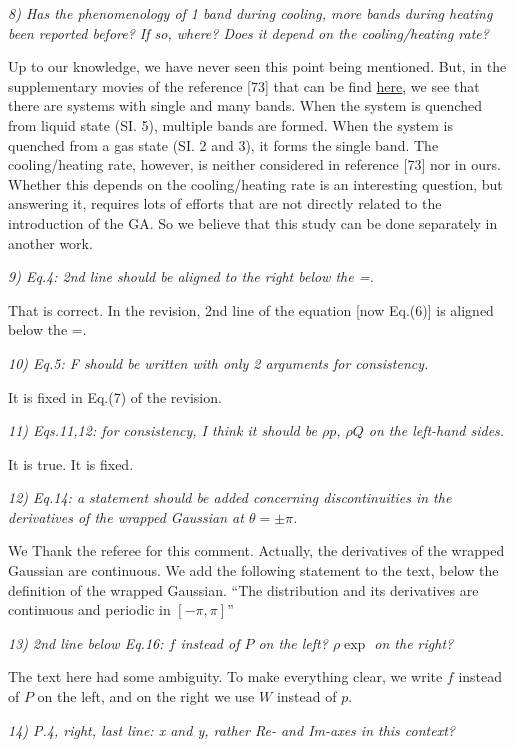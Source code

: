 \documentclass[a4paper,11pt]{letter}
\newcommand{\p}{p}
\newcommand{\w}{W}
\newcommand{\rf}[1]{\textit{\textcolor{hlcolor}{#1}}}
\begin{document}
\rf{8) Has the phenomenology of 1 band during cooling, more bands during heating been reported before? If so, where? Does it depend on the cooling/heating rate?}

Up to our knowledge, we have never seen this point being mentioned. But, in the supplementary movies of the reference [73] that can be find \href{http://journals.aps.org/prl/abstract/10.1103/PhysRevLett.114.068101}{here}, we see that there are systems with single and many bands. When the system is quenched from liquid state (SI. 5), multiple bands are formed. When the system is quenched from a gas state (SI. 2 and 3), it forms the single band. The cooling/heating rate, however, is neither considered in reference [73] nor in ours. Whether this depends on the cooling/heating rate is an interesting question, but answering it, requires lots of efforts that are not directly related to the introduction of the GA. So we believe that this study can be done separately in another work.

\rf{9) Eq.4: 2nd line should be aligned to the right below the =.}

That is correct. In the revision, 2nd line of the equation [now Eq.(6)] is aligned below the =.

\rf{10) Eq.5: F should be written with only 2 arguments for consistency.}

It is fixed in Eq.(7) of the revision.

\rf{11) Eqs.11,12: for consistency, I think it should be $\rho \p$, $\rho Q$ on the left-hand sides.}

It is true. It is fixed.

\rf{12) Eq.14: a statement should be added concerning discontinuities in the derivatives of the wrapped Gaussian at $\theta=\pm \pi$.}

We Thank the referee for this comment. Actually, the derivatives of the wrapped Gaussian are continuous. We add the following statement to the text, below the definition of the wrapped Gaussian. ``The distribution and its derivatives are continuous and periodic in $[-\pi,\pi]$''

\rf{13) 2nd line below Eq.16: $f$ instead of $P$ on the left? $\rho \exp$ on the right?}

The text here had some ambiguity. To make everything clear, we write $f$ instead of $P$ on the left, and on the right we use $\w$ instead of $\p$.

\rf{14) P.4, right, last line: x and y, rather Re- and Im-axes in this context?}
\end{document}
